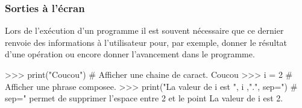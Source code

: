 \begin{frame}[fragile]
\frametitle{Sorties à l'écran}

Lors de l'exécution d'un programme il est souvent nécessaire que ce dernier renvoie des informations à l'utilisateur pour,
par exemple, donner le résultat d'une opération ou encore donner l'avancement dans le programme.	

\begin{GrayBox}[0.75\textwidth]
\begin{verbatimtab}[3]
>>> print("Coucou") # Afficher une chaine de caract.
	Coucou
>>> i = 2
# Afficher une phrase composee.
>>> print("La valeur de i est ", i ,".", sep=")
# sep=" permet de supprimer l'espace entre 2 et le point
	La valeur de i est 2.
\end{verbatimtab}
\end{GrayBox}
\end{frame}

